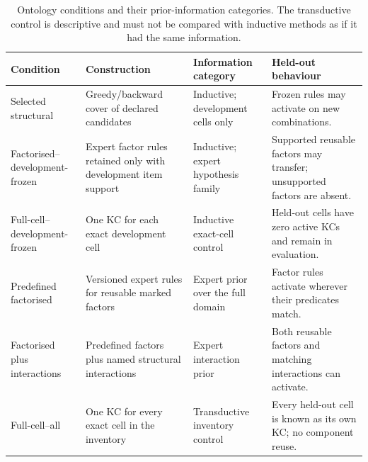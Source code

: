 \begin{table}[t]
  \centering
  \small
  \begin{tabularx}{\textwidth}{@{}
    >{\raggedright\arraybackslash}p{}
    >{\raggedright\arraybackslash}p{}
    >{\raggedright\arraybackslash}p{}
    >{\raggedright\arraybackslash}X@{}}
    \toprule
    Condition & Construction & Information category & Held-out behaviour \\
    \midrule
    Selected structural
      & Greedy/backward cover of declared candidates
      & Inductive; development cells only
      & Frozen rules may activate on new combinations. \\
    Factorised--development-frozen
      & Expert factor rules retained only with development item support
      & Inductive; expert hypothesis family
      & Supported reusable factors may transfer; unsupported factors are absent. \\
    Full-cell--development-frozen
      & One KC for each exact development cell
      & Inductive exact-cell control
      & Held-out cells have zero active KCs and remain in evaluation. \\
    Predefined factorised
      & Versioned expert rules for reusable marked factors
      & Expert prior over the full domain
      & Factor rules activate wherever their predicates match. \\
    Factorised plus interactions
      & Predefined factors plus named structural interactions
      & Expert interaction prior
      & Both reusable factors and matching interactions can activate. \\
    Full-cell--all
      & One KC for every exact cell in the inventory
      & Transductive inventory control
      & Every held-out cell is known as its own KC; no component reuse. \\
    \bottomrule
  \end{tabularx}
  \caption{Ontology conditions and their prior-information categories.  The
  transductive control is descriptive and must not be compared with inductive
  methods as if it had the same information.}
  \label{tab:ontology-conditions}
\end{table}
